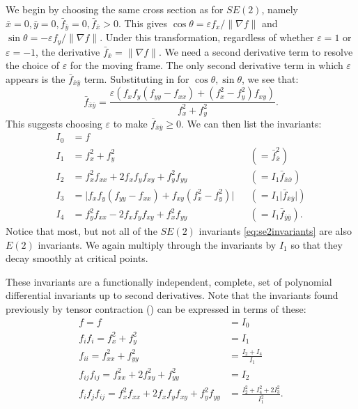 \documentclass[review,onefignum,onetabnum]{siamonline190516}
\begin{document}
{We begin by choosing the same cross section as for $SE(2)$, namely $\bar{x} = 0,
\bar{y} = 0, \bar{f}_{\bar{y}} = 0, \bar{f}_{\bar{x}} > 0$. This gives
$\cos\theta = \varepsilon f_x / \lVert \nabla f \rVert$ and $\sin\theta =
-\varepsilon f_y / \lVert \nabla f \rVert$. Under this transformation,
regardless of whether $\varepsilon = 1$ or $\varepsilon = -1$, the
derivative $\bar{f}_{\bar{x}} = \lVert \nabla f \rVert$. We need a second
derivative term to resolve the choice of $\varepsilon$ for the moving
frame. The only second derivative term in which $\varepsilon$ appears is
the $\bar{f}_{\bar{x}\bar{y}}$ term. Substituting in for $\cos\theta,
\sin\theta$, we see that:
\begin{equation*}
    \bar{f}_{\bar{x}\bar{y}} = \frac{\varepsilon(f_xf_y(f_{yy} - f_{xx}) + (f_x^2 -
    f_y^2)f_{xy})}{f_x^2 + f_y^2}.
\end{equation*}
This suggests choosing $\varepsilon$ to make $\bar{f}_{\bar{x}\bar{y}} \ge
0$. We can then list the invariants:
\begin{equation}\label{eq:e2invariants}
\begin{aligned}
  I_0 &= f \\
  I_1 &= f_x^2 + f_y^2 & &(= \bar{f}_{\bar{x}}^2)\\
  I_2 &= f_x^2 f_{xx} + 2 f_x f_y f_{xy} + f_y^2 f_{yy} &&(= I_1\bar{f}_{\bar{x}\bar{x}}) \\
  I_3 &= \lvert f_x f_y (f_{yy} - f_{xx}) + f_{xy} (f_x^2 - f_y^2)\rvert
  &&(= I_1\lvert \bar{f}_{\bar{x}\bar{y}}\rvert)\\
  I_4 &= f_y^2 f_{xx} - 2 f_x f_y f_{xy} + f_x^2 f_{yy} &&(= I_1\bar{f}_{\bar{y}\bar{y}}).
\end{aligned}
\end{equation}
Notice that most, but not all of the $SE(2)$ invariants
\eqref{eq:se2invariants} are also $E(2)$ invariants. We again multiply
through the invariants by $I_1$ so that they decay smoothly at critical
points.

These invariants are a functionally independent, complete, set of polynomial differential invariants up to second derivatives. Note that the invariants found previously by tensor contraction (\cite{eq:se2}) can be expressed in terms of these:
\begin{align*}
  f = f &= I_0 \\
  f_if_i = f_x^2 + f_y^2 &= I_1 \\
  f_{ii} = f_{xx}^2 + f_{yy}^2 &= \frac{I_2 + I_4}{I_1} \\
  f_{ij} f_{ij} = f_{xx}^2 + 2f_{xy}^2 + f_{yy}^2 &= I_2\\
  f_i f_j f_{ij} = f_x^2 f_{xx} + 2f_x f_y f_{xy} + f_y^2 f_{yy} &= \frac{I_2^2 + I_4^2 + 2I_3^2}{I_1^2}.
\end{align*}

}
\end{document}
